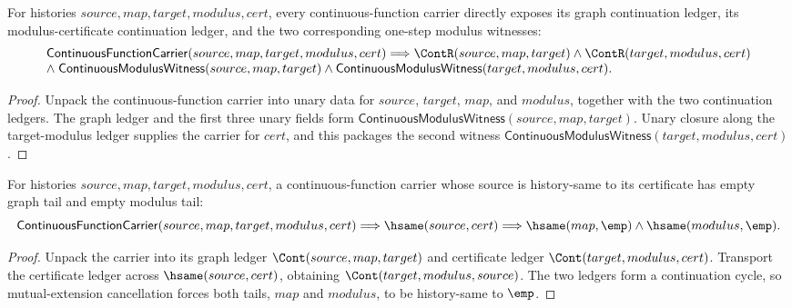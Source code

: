 \begin{theorem}
\label{thm:continuous-function-carrier-graph-modulus-cont-readback}
For histories $source,map,target,modulus,cert$, every continuous-function
carrier directly exposes its graph continuation ledger, its
modulus-certificate continuation ledger, and the two corresponding one-step
modulus witnesses:
$$
\begin{array}{l}
\mathsf{ContinuousFunctionCarrier}(source,map,target,modulus,cert)
\Longrightarrow
\ContR(source,map,target)\land
\ContR(target,modulus,cert)
\\
\land\;
\mathsf{ContinuousModulusWitness}(source,map,target)\land
\mathsf{ContinuousModulusWitness}(target,modulus,cert).
\end{array}
$$
\end{theorem}
\begin{proof}
Unpack the continuous-function carrier into unary data for $source$, $target$,
$map$, and $modulus$, together with the two continuation ledgers. The graph
ledger and the first three unary fields form
$\mathsf{ContinuousModulusWitness}(source,map,target)$. Unary closure along
the target-modulus ledger supplies the carrier for $cert$, and this packages
the second witness
$\mathsf{ContinuousModulusWitness}(target,modulus,cert)$.
\end{proof}

\begin{theorem}
\label{thm:continuous-function-carrier-endpoint-cert-cycle-tails-empty}
For histories \(source,map,target,modulus,cert\), a continuous-function carrier
whose source is history-same to its certificate has empty graph tail and empty
modulus tail:
$$
\mathsf{ContinuousFunctionCarrier}(source,map,target,modulus,cert)
\Longrightarrow
\hsame(source,cert)
\Longrightarrow
\hsame(map,\emp)\land\hsame(modulus,\emp).
$$
\end{theorem}
\begin{proof}
Unpack the carrier into its graph ledger \(\Cont(source,map,target)\) and
certificate ledger \(\Cont(target,modulus,cert)\). Transport the certificate
ledger across \(\hsame(source,cert)\), obtaining
\(\Cont(target,modulus,source)\). The two ledgers form a continuation cycle,
so mutual-extension cancellation forces both tails, \(map\) and \(modulus\),
to be history-same to \(\emp\).
\end{proof}

